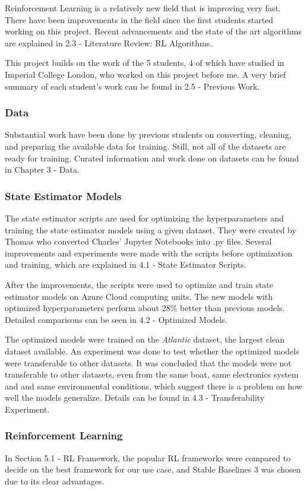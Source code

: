\documentclass[12pt,twoside]{report}
\begin{document}
Reinforcement Learning is a relatively new field that is improving very fast. There have been improvements in the field since the first students started working on this project. Recent advancements and the state of the art algorithms are explained in 2.3 - Literature Review: RL Algorithms.

This project builds on the work of the 5 students, 4 of which have studied in Imperial College London, who worked on this project before me. A very brief summary of each student's work can be found in 2.5 - Previous Work.

\subsubsection{Data}
Substantial work have been done by previous students on converting, cleaning, and preparing the available data for training. Still, not all of the datasets are ready for training. Curated information and work done on datasets can be found in Chapter 3 - Data.

\subsubsection{State Estimator Models}
The state estimator scripts are used for optimizing the hyperparameters and training the state estimator models using a given dataset. They were created by Thomas who converted Charles' Jupyter Notebooks into .py files. Several improvements and experiments were made with the scripts before optimization and training, which are explained in 4.1 - State Estimator Scripts.

After the improvements, the scripts were used to optimize and train state estimator models on Azure Cloud computing units. The new models with optimized hyperparameters perform about 28\% better than previous models. Detailed comparisons can be seen in 4.2 - Optimized Models.

The optimized models were trained on the \textit{Atlantic} dataset, the largest clean dataset available. An experiment was done to test whether the optimized models were transferable to other datasets. It was concluded that the models were not transferable to other datasets, even from the same boat, same electronics system and and same environmental conditions, which suggest there is a problem on how well the models generalize. Details can be found in 4.3 - Transferability Experiment.


\subsubsection{Reinforcement Learning}
In Section 5.1 - RL Framework, the popular RL frameworks were compared to decide on the best framework for our use case, and Stable Baselines 3 was chosen due to its clear advantages.
\end{document}
